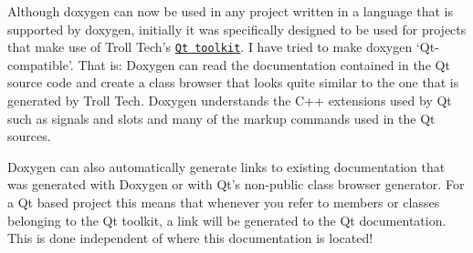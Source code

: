 Although doxygen can now be used in any project written in a language that is supported by doxygen, initially it was specifically designed to be used for projects that make use of Troll Tech's \href{http://www.trolltech.com/products/qt.html}{\tt Qt toolkit}. I have tried to make doxygen `Qt-compatible'. That is: Doxygen can read the documentation contained in the Qt source code and create a class browser that looks quite similar to the one that is generated by Troll Tech. Doxygen understands the C++ extensions used by Qt such as signals and slots and many of the markup commands used in the Qt sources.

Doxygen can also automatically generate links to existing documentation that was generated with Doxygen or with Qt's non-public class browser generator. For a Qt based project this means that whenever you refer to members or classes belonging to the Qt toolkit, a link will be generated to the Qt documentation. This is done independent of where this documentation is located! 